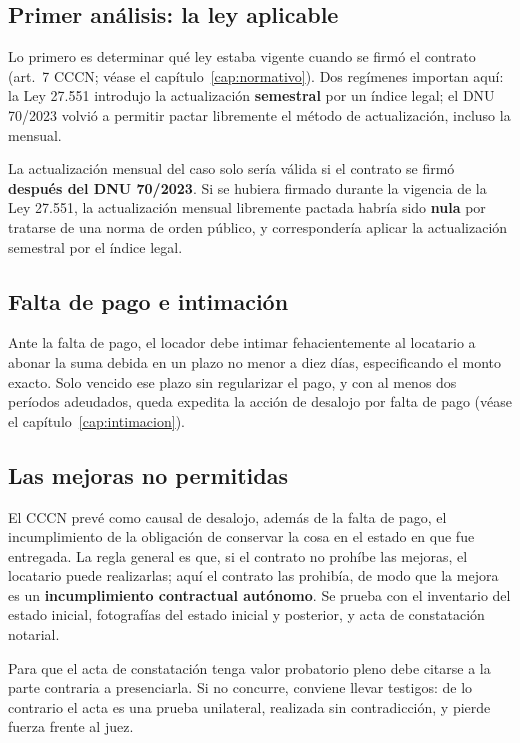 \documentclass[12pt,oneside]{book}
\begin{document}
\subsection{Primer análisis: la ley aplicable}

Lo primero es determinar qué ley estaba vigente cuando se firmó el contrato (art.\ 7 CCCN; véase el capítulo~\ref{cap:normativo}). Dos regímenes importan aquí: la Ley 27.551 introdujo la actualización \textbf{semestral} por un índice legal; el DNU 70/2023 volvió a permitir pactar libremente el método de actualización, incluso la mensual.

\begin{important}
La actualización mensual del caso solo sería válida si el contrato se firmó \textbf{después del DNU 70/2023}. Si se hubiera firmado durante la vigencia de la Ley 27.551, la actualización mensual libremente pactada habría sido \textbf{nula} por tratarse de una norma de orden público, y correspondería aplicar la actualización semestral por el índice legal.
\end{important}

\subsection{Falta de pago e intimación}

Ante la falta de pago, el locador debe intimar fehacientemente al locatario a abonar la suma debida en un plazo no menor a diez días, especificando el monto exacto. Solo vencido ese plazo sin regularizar el pago, y con al menos dos períodos adeudados, queda expedita la acción de desalojo por falta de pago (véase el capítulo~\ref{cap:intimacion}).

\subsection{Las mejoras no permitidas}

El CCCN prevé como causal de desalojo, además de la falta de pago, el incumplimiento de la obligación de conservar la cosa en el estado en que fue entregada. La regla general es que, si el contrato no prohíbe las mejoras, el locatario puede realizarlas; aquí el contrato las prohibía, de modo que la mejora es un \textbf{incumplimiento contractual autónomo}. Se prueba con el inventario del estado inicial, fotografías del estado inicial y posterior, y acta de constatación notarial.

\begin{important}
Para que el acta de constatación tenga valor probatorio pleno debe citarse a la parte contraria a presenciarla. Si no concurre, conviene llevar testigos: de lo contrario el acta es una prueba unilateral, realizada sin contradicción, y pierde fuerza frente al juez.
\end{important}
\end{document}
